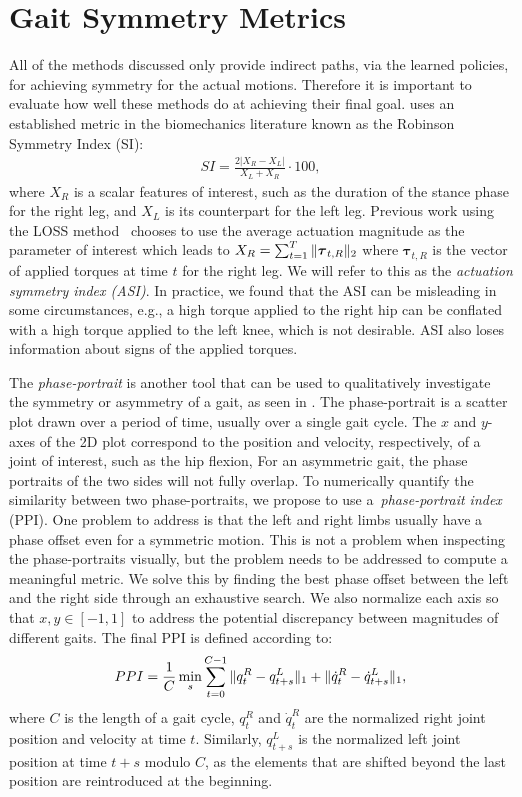 \section{Gait Symmetry Metrics}
\label{sec:metrics}

All of the methods discussed only provide indirect paths, via the learned policies, 
for achieving symmetry for the actual motions. 
Therefore it is important to evaluate how well these methods do at achieving their final goal. 
\citeauthor{Yu-SIGGRAPH-2018}\cite{Yu-SIGGRAPH-2018} uses an established metric in the biomechanics literature 
known as the Robinson Symmetry Index (SI):
\begin{align}
    SI = \frac{2|X_R - X_L|}{X_L + X_R}\cdot 100,
\end{align}
where $X_R$ is a scalar features of interest, such as the duration of the stance phase 
for the right leg, and $X_L$ is its counterpart for the left leg. 
Previous work using the LOSS method~\cite{Yu-SIGGRAPH-2018} chooses to use the average actuation 
magnitude as the parameter of interest which leads to $X_R = \sum_{t=1}^T \|\boldsymbol{\tau}_{t,R}\|_2$ where $\boldsymbol{\tau}_{t,R}$ is the vector of applied torques at time $t$ for the right leg. 
We will refer to this as the \textit{actuation symmetry index (ASI)}.
In practice, we found that the ASI can be misleading in some circumstances, 
e.g., a high torque applied to the right hip can be conflated with a high torque applied to the left knee, 
which is not desirable. ASI also loses information about signs of the applied torques.

The \textit{phase-portrait} is another tool that can be used to qualitatively investigate 
the symmetry or asymmetry of a gait, as seen in \cite{symmetry_phase_portrait}. 
The phase-portrait is a scatter plot drawn over a period of time, usually over a single gait cycle.
The $x$ and $y$-axes of the 2D plot correspond to the position and velocity, respectively, of a joint of interest, 
such as the hip flexion, 
For an asymmetric gait, the phase portraits of the two sides will not fully overlap.
To numerically quantify the similarity between two phase-portraits, we propose to use a~\textit{phase-portrait index} (PPI).  
One problem to address is that the left and right limbs usually have a phase offset even for a symmetric motion.
This is not a problem when inspecting the phase-portraits visually, but the problem needs to be addressed to compute a 
meaningful metric.
We solve this by finding the best phase offset between the left and the right side through an exhaustive search. 
We also normalize each axis so that $x,y\in[-1,1]$ to address the potential discrepancy between magnitudes of different gaits.
The final PPI is defined according to:
\begin{align}
    PPI = \frac{1}{C} \min_s \sum_{t=0}^{C-1} \|q_t^R - q_{t+s}^L\|_1 + \|\dot{q}_t^R - \dot{q}_{t+s}^L\|_1,
\end{align}
where $C$ is the length of a gait cycle, $q_t^R$ and $\dot{q}_t^R$ are the normalized right joint 
position and velocity at time $t$. Similarly, $q_{t+s}^L$ is the normalized left joint position 
at time $t+s$ modulo $C$, as the elements that are shifted beyond the last position are reintroduced at the beginning.

